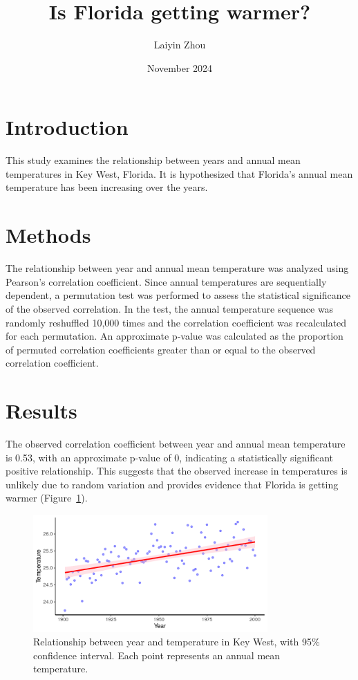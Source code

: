 \documentclass[12pt]{article}
\title{Is Florida getting warmer?}
\author{Laiyin Zhou}
\date{November 2024}
\begin{document}
    \maketitle

    \section{Introduction}
    This study examines the relationship between years and annual mean temperatures in Key West, Florida. It is hypothesized that Florida’s annual mean temperature has been increasing over the years.

    \section{Methods}
    The relationship between year and annual mean temperature was analyzed using Pearson’s correlation coefficient. Since annual temperatures are sequentially dependent, a permutation test was performed to assess the statistical significance of the observed correlation. In the test, the annual temperature sequence was randomly reshuffled 10,000 times and the correlation coefficient was recalculated for each permutation. An approximate p-value was calculated as the proportion of permuted correlation coefficients greater than or equal to the observed correlation coefficient.
    
    \section{Results}
    The observed correlation coefficient between year and annual mean temperature is 0.53, with an approximate p-value of 0, indicating a statistically significant positive relationship. This suggests that the observed increase in temperatures is unlikely due to random variation and provides evidence that Florida is getting warmer (Figure~\ref{fig:pdfimage}).
        
    \begin{figure}[h!]
        \centering
        \includegraphics[width=0.8\textwidth]{../results/Florida.pdf}  %
        \caption{Relationship between year and temperature in Key West, with 95\% confidence interval. Each point represents an annual mean temperature.}
        \label{fig:pdfimage}
    \end{figure}
\end{document}
